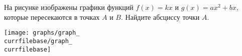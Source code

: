 \begin{ex}
	\begin{condition}
		\begin{minipage}[t]{0.67\textwidth}
			На рисунке изображены графики функций \( f(x)=kx \) и \( g(x)=ax^2+bx \), которые пересекаются в точках \( A \) и \( B \). Найдите абсциссу точки \( A \).
		\end{minipage}
		\begin{minipage}[c]{0.25\textwidth}
			\texttt{[image: graphs/graph\_\\currfilebase/graph\_\\currfilebase]}
		\end{minipage}
	\end{condition}
\end{ex}